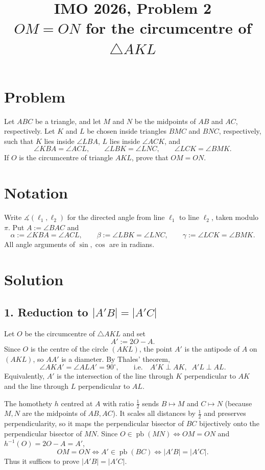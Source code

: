 \documentclass[11pt]{article}
\title{IMO 2026, Problem 2\\[2pt] \large $OM=ON$ for the circumcentre of $\triangle AKL$}
\author{}
\date{}
\newcommand{\dangle}{\measuredangle}
\newcommand{\perpbis}{\operatorname{pb}}
\theoremstyle{plain}\newtheorem{lemma}{Lemma}
\theoremstyle{remark}\newtheorem*{rmk}{Remark}
\begin{document}
\maketitle

\section*{Problem}

Let $ABC$ be a triangle, and let $M$ and $N$ be the midpoints of $AB$ and $AC$,
respectively. Let $K$ and $L$ be chosen inside triangles $BMC$ and $BNC$,
respectively, such that $K$ lies inside $\angle LBA$, $L$ lies inside
$\angle ACK$, and
\[
  \angle KBA=\angle ACL,\qquad
  \angle LBK=\angle LNC,\qquad
  \angle LCK=\angle BMK.
\]
If $O$ is the circumcentre of triangle $AKL$, prove that $OM=ON$.

\section*{Notation}

Write $\dangle(\ell_1,\ell_2)$ for the directed angle from line $\ell_1$ to line
$\ell_2$, taken modulo $\pi$. Put $A:=\angle BAC$ and
\[
  \alpha:=\angle KBA=\angle ACL,\qquad
  \beta :=\angle LBK=\angle LNC,\qquad
  \gamma :=\angle LCK=\angle BMK.
\]
All angle arguments of $\sin,\cos$ are in radians.

\section*{Solution}

\subsection*{1. Reduction to $|A'B|=|A'C|$}

Let $O$ be the circumcentre of $\triangle AKL$ and set
\[
  A' := 2O-A .
\]
Since $O$ is the centre of the circle $(AKL)$, the point $A'$ is the antipode of
$A$ on $(AKL)$, so $AA'$ is a diameter. By Thales' theorem,
\[
  \angle AKA'=\angle ALA'=90^{\circ},\qquad\text{i.e.}\quad A'K\perp AK,\;\; A'L\perp AL. \tag{R1}
\]
Equivalently, $A'$ is the intersection of the line through $K$ perpendicular to
$AK$ and the line through $L$ perpendicular to $AL$.

The homothety $h$ centred at $A$ with ratio $\tfrac12$ sends $B\mapsto M$ and
$C\mapsto N$ (because $M,N$ are the midpoints of $AB,AC$). It scales all
distances by $\tfrac12$ and preserves perpendicularity, so it maps the
perpendicular bisector of $BC$ bijectively onto the perpendicular bisector of
$MN$. Since $O\in\perpbis(MN)\iff OM=ON$ and $h^{-1}(O)=2O-A=A'$,
\[
  OM=ON \iff A'\in\perpbis(BC)\iff |A'B|=|A'C|. \tag{R2}
\]
Thus it suffices to prove $|A'B|=|A'C|$.
\end{document}
